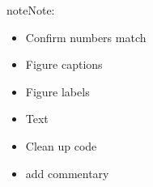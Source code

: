 \documentclass[letterpaper,10pt,english]{jupyterBook}
\begin{document}
\begin{sphinxShadowBox}
\sphinxstylesidebartitle{}

\begin{sphinxadmonition}{note}{Note:}
\sphinxAtStartPar
{}
\begin{itemize}
\item {} 
\sphinxAtStartPar
Confirm numbers match

\item {} 
\sphinxAtStartPar
Figure captions

\item {} 
\sphinxAtStartPar
Figure labels

\item {} 
\sphinxAtStartPar
Text

\item {} 
\sphinxAtStartPar
Clean up code

\item {} 
\sphinxAtStartPar
add commentary

\end{itemize}
\end{sphinxadmonition}
\end{sphinxShadowBox}
\end{document}
